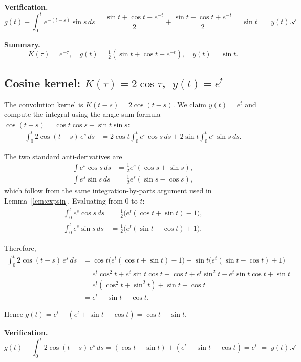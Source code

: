 \documentclass[11pt]{article}
\begin{document}
\medskip\noindent\textbf{Verification.}
\[
  g(t) + \int_0^t e^{-(t-s)}\sin s\,ds
  = \frac{\sin t+\cos t-e^{-t}}{2} + \frac{\sin t-\cos t+e^{-t}}{2}
  = \sin t \;=\; y(t). \checkmark
\]

\medskip\noindent\textbf{Summary.}
\[
  \boxed{K(\tau)=e^{-\tau},\quad
         g(t)=\tfrac{1}{2}(\sin t+\cos t-e^{-t}),\quad y(t)=\sin t.}
\]

\subsection{Cosine kernel: $K(\tau)=2\cos\tau$, $\;y(t)=e^{t}$}

The convolution kernel is $K(t-s)=2\cos(t-s)$.  We claim $y(t)=e^t$
and compute the integral using the angle-sum formula
$\cos(t-s)=\cos t\cos s+\sin t\sin s$:
\begin{align*}
  \int_0^t 2\cos(t-s)\,e^s\,ds
  &= 2\cos t\int_0^t e^s\cos s\,ds
   + 2\sin t\int_0^t e^s\sin s\,ds.
\end{align*}

The two standard anti-derivatives are
\begin{align*}
  \int e^s\cos s\,ds &= \tfrac{1}{2}e^s(\cos s+\sin s), \\
  \int e^s\sin s\,ds &= \tfrac{1}{2}e^s(\sin s-\cos s),
\end{align*}
which follow from the same integration-by-parts argument used in
Lemma~\ref{lem:expsin}.  Evaluating from $0$ to $t$:
\begin{align*}
  \int_0^t e^s\cos s\,ds &= \tfrac{1}{2}\bigl(e^t(\cos t+\sin t)-1\bigr), \\
  \int_0^t e^s\sin s\,ds &= \tfrac{1}{2}\bigl(e^t(\sin t-\cos t)+1\bigr).
\end{align*}

Therefore,
\begin{align*}
  \int_0^t 2\cos(t-s)\,e^s\,ds
  &= \cos t\bigl(e^t(\cos t+\sin t)-1\bigr)
   + \sin t\bigl(e^t(\sin t-\cos t)+1\bigr) \\
  &= e^t\cos^2 t + e^t\sin t\cos t - \cos t
   + e^t\sin^2 t - e^t\sin t\cos t + \sin t \\
  &= e^t(\cos^2 t+\sin^2 t) + \sin t - \cos t \\
  &= e^t + \sin t - \cos t.
\end{align*}

Hence $g(t) = e^t - (e^t+\sin t-\cos t) = \cos t - \sin t$.

\medskip\noindent\textbf{Verification.}
\[
  g(t) + \int_0^t 2\cos(t-s)\,e^s\,ds
  = (\cos t-\sin t) + (e^t+\sin t-\cos t)
  = e^t \;=\; y(t). \checkmark
\]
\end{document}
